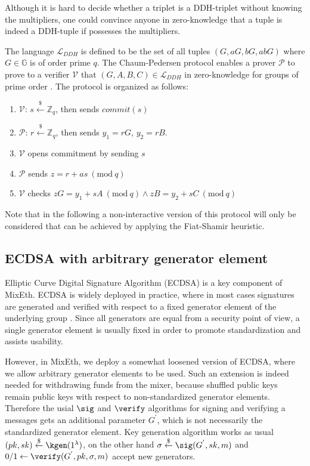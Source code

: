 \documentclass[a4paper]{article}
\theoremstyle{definition}
\newcommand{\Mod}[1]{\ (\mathrm{mod}\ #1)}
\begin{document}
 Although it is hard to decide whether a triplet is a DDH-triplet without knowing the multipliers, one could convince anyone in zero-knowledge that a tuple is indeed a DDH-tuple if possesses the multipliers.    

The language $\mathcal{L}_{DDH}$ is defined to be the set of all tuples $(G,aG,bG,abG)$ where $G\in \mathbb{G}$ is of order prime $q$. The Chaum-Pedersen protocol enables a prover $\mathcal{P}$ to prove to a verifier $\mathcal{V}$ that $(G,A,B,C)\in\mathcal{L}_{DDH}$ in zero-knowledge for groups of prime order \cite{chaum1992wallet}. The protocol is organized as follows:

\begin{enumerate}
	\item $\mathcal{V}$: $s\stackrel{\$}{\leftarrow}\mathbb{Z}_q$, then sends $commit(s)$ 
	\item $\mathcal{P}$: $r\stackrel{\$}{\leftarrow}\mathbb{Z}_q$, then sends $y_1=rG$, $y_2=rB$.
	\item $\mathcal{V}$ opens commitment by sending $s$
	\item $\mathcal{P}$ sends $z=r+as \Mod{q}$
	\item $\mathcal{V}$ checks $zG=y_{1}+sA \Mod{q} \land zB=y_{2}+sC \Mod{q}$
\end{enumerate} 
Note that in the following a non-interactive version of this protocol will only be considered that can be achieved by applying the Fiat-Shamir heuristic. 

\subsection{ECDSA with arbitrary generator element}
Elliptic Curve Digital Signature Algorithm (ECDSA) is a key component of MixEth. ECDSA is widely deployed in practice, where in most cases signatures are generated and verified with respect to a fixed generator element of the underlying group \cite{fersch2016provable}. Since all generators are equal from a security point of view, a single generator element is usually fixed in order to promote standardization and assists usability.

However, in MixEth, we deploy a somewhat loosened version of ECDSA, where we allow arbitrary generator elements to be used. Such an extension is indeed needed for withdrawing funds from the mixer, because shuffled public keys remain public keys with respect to non-standardized generator elements. Therefore the usial $\sig$ and $\verify$ algorithms for signing and verifying a messages gets an additional parameter $G^{'}$, which is not necessarily the standardized generator element. Key generation algorithm works as usual $(pk,sk)\stackrel{\$}{\leftarrow}\kgen(1^{\lambda})$, on the other hand $\sigma\stackrel{\$}{\leftarrow}\sig(G^{'},sk,m)$ and  $0/1\leftarrow \verify(G^{'},pk,\sigma, m)$ accept new generators.
\end{document}

